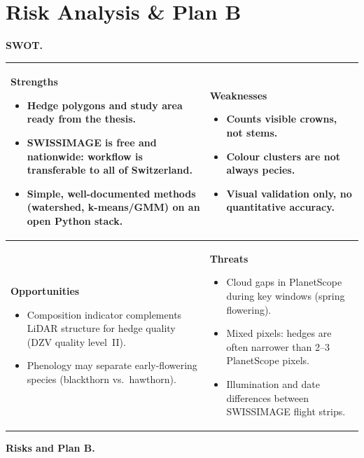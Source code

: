 \documentclass[10pt,a4paper]{article}
\begin{document}
\newpage
\section*{Risk Analysis \& Plan B}

\textbf{SWOT.}
\vspace{2pt}

{\footnotesize
{}
\begin{tabularx}{\textwidth}{@{}
  >{\raggedright\arraybackslash}X
  >{\raggedright\arraybackslash}X@{}}
\toprule
\textbf{Strengths}
\begin{itemize}
\item Hedge polygons and study area ready from the
  thesis.
\item SWISSIMAGE is free and nationwide: workflow is
  transferable to all of Switzerland.
\item Simple, well-documented methods (watershed,
  k-means/GMM) on an open Python stack.
\end{itemize}
&
\textbf{Weaknesses}
\begin{itemize}
\item Counts visible crowns, not stems.
\item Colour clusters are not always pecies.
\item Visual validation only, no quantitative
  accuracy.
\end{itemize}
\\ \midrule
\textbf{Opportunities}
\begin{itemize}
\item Composition indicator complements LiDAR structure
  for hedge quality (DZV quality level~II).
\item Phenology may separate early-flowering species
  (blackthorn vs.\ hawthorn).
\end{itemize}
&
\textbf{Threats}
\begin{itemize}
\item Cloud gaps in PlanetScope during key windows
  (spring flowering).
\item Mixed pixels: hedges are often narrower than
  2--3 PlanetScope pixels.
\item Illumination and date differences between
  SWISSIMAGE flight strips.
\end{itemize}
\\ \bottomrule
\end{tabularx}
}

\vspace{6pt}
\textbf{Risks and Plan B.}
\vspace{2pt}
\end{document}
